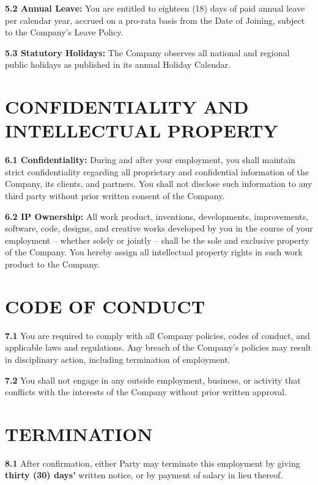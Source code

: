 \documentclass[10pt]{article}
\begin{document}
\textbf{5.2 Annual Leave:} You are entitled to eighteen (18) days of paid annual leave per calendar year, accrued on a pro-rata basis from the Date of Joining, subject to the Company's Leave Policy.

\textbf{5.3 Statutory Holidays:} The Company observes all national and regional public holidays as published in its annual Holiday Calendar.

\section{CONFIDENTIALITY AND INTELLECTUAL PROPERTY}

\textbf{6.1 Confidentiality:} During and after your employment, you shall maintain strict confidentiality regarding all proprietary and confidential information of the Company, its clients, and partners. You shall not disclose such information to any third party without prior written consent of the Company.

\textbf{6.2 IP Ownership:} All work product, inventions, developments, improvements, software, code, designs, and creative works developed by you in the course of your employment -- whether solely or jointly -- shall be the sole and exclusive property of the Company. You hereby assign all intellectual property rights in such work product to the Company.

\section{CODE OF CONDUCT}

\textbf{7.1} You are required to comply with all Company policies, codes of conduct, and applicable laws and regulations. Any breach of the Company's policies may result in disciplinary action, including termination of employment.

\textbf{7.2} You shall not engage in any outside employment, business, or activity that conflicts with the interests of the Company without prior written approval.

\section{TERMINATION}

\textbf{8.1} After confirmation, either Party may terminate this employment by giving \textbf{thirty (30) days'} written notice, or by payment of salary in lieu thereof.
\end{document}
